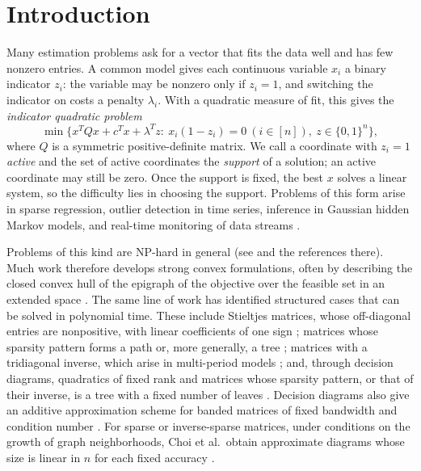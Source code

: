 \section{Introduction}\label{sec:intro}
Many estimation problems ask for a vector that fits the data well and has
few nonzero entries. A common model gives each continuous variable $x_i$
a binary indicator $z_i$: the variable may be nonzero only if $z_i=1$,
and switching the indicator on costs a penalty $\lambda_i$. With a
quadratic measure of fit, this gives the \emph{indicator quadratic
problem}
\[
 \min\bigl\{x^TQx+c^Tx+\lambda^Tz:\ x_i(1-z_i)=0\ (i\in[n]),\
 z\in\{0,1\}^n\bigr\},
\]
where $Q$ is a symmetric positive-definite matrix. We call a coordinate
with $z_i=1$ \emph{active} and the set of active coordinates the
\emph{support} of a solution; an active coordinate may still be zero.
Once the support is fixed, the best $x$ solves a linear system, so the
difficulty lies in choosing the support. Problems of this form arise in
sparse regression, outlier detection in time series, inference in
Gaussian hidden Markov models, and real-time monitoring of data streams
\cite{BhathenaTrees,BhathenaStructured,GomezBanded}.

Problems of this kind are NP-hard in general (see
\cite{WeiHull,ChoiDiagrams} and the references there). Much work
therefore develops strong convex formulations, often by describing the
closed convex hull of the epigraph of the objective over the feasible
set in an extended space
\cite{AtamturkGomezM,WeiHull,LiuStieltjes,LeeMultiperiod,ChoiDiagrams}.
The same line of work has identified structured cases that can be
solved in polynomial time. These include Stieltjes matrices, whose
off-diagonal entries are nonpositive, with linear coefficients of one
sign \cite{AtamturkGomezM,LiuStieltjes}; matrices whose sparsity pattern
forms a path \cite{LiuPath} or, more generally, a tree
\cite{BhathenaTrees}; matrices with a tridiagonal inverse, which arise
in multi-period models \cite{LeeMultiperiod}; and, through decision
diagrams, quadratics of fixed rank and matrices whose sparsity pattern,
or that of their inverse, is a tree with a fixed number of leaves
\cite{ChoiDiagrams}. Decision diagrams also give an additive
approximation scheme for banded matrices of fixed bandwidth and
condition number \cite{GomezBanded}. For sparse or inverse-sparse
matrices, under conditions on the growth of graph neighborhoods, Choi
et al.\ obtain approximate diagrams whose size is linear in $n$ for each
fixed accuracy \cite{ChoiDiagrams}.

